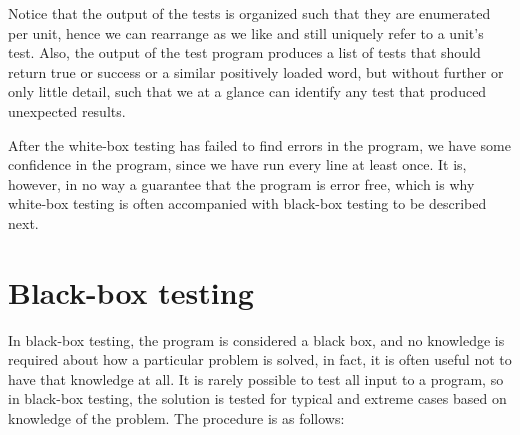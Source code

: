 Notice that the output of the tests is organized such that they are enumerated per unit, hence we can rearrange as we like and still uniquely refer to a unit's test. Also, the output of the test program produces a list of tests that should return true or success or a similar positively loaded word, but without further or only little detail, such that we at a glance can identify any test that produced unexpected results.

After the white-box testing has failed to find errors in the program, we have some confidence in the program, since we have run every line at least once. It is, however, in no way a guarantee that the program is error free, which is why white-box testing is often accompanied with black-box testing to be described next.

\section{Black-box testing}
In black-box testing, the program is considered a black box, and no knowledge is required about how a particular problem is solved, in fact, it is often useful not to have that knowledge at all. It is rarely possible to test all input to a program, so in black-box testing, the solution is tested for typical and extreme cases based on knowledge of the problem. The procedure is as follows:
